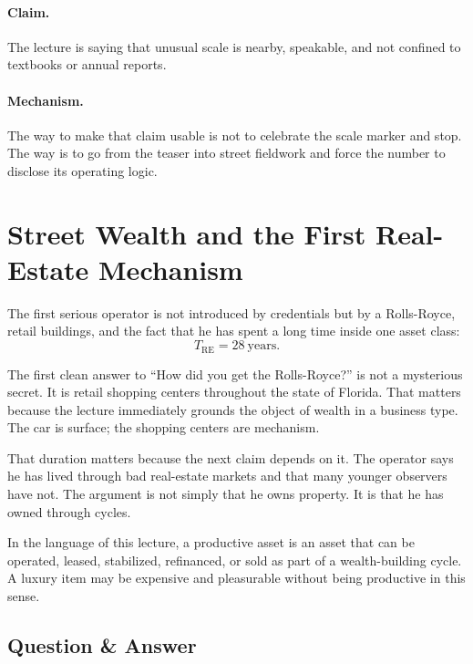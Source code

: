 \paragraph{Claim.}
The lecture is saying that unusual scale is nearby, speakable, and not confined to textbooks or annual reports.

\paragraph{Mechanism.}
The way to make that claim usable is not to celebrate the scale marker and stop. The way is to go from the teaser into street fieldwork and force the number to disclose its operating logic.

\section{Street Wealth and the First Real-Estate Mechanism}

The first serious operator is not introduced by credentials but by a Rolls-Royce, retail buildings, and the fact that he has spent a long time inside one asset class:
\begin{equation}
T_{\mathrm{RE}} = 28\ \text{years}.
\end{equation}

The first clean answer to ``How did you get the Rolls-Royce?'' is not a mysterious secret. It is retail shopping centers throughout the state of Florida. That matters because the lecture immediately grounds the object of wealth in a business type. The car is surface; the shopping centers are mechanism.

That duration matters because the next claim depends on it. The operator says he has lived through bad real-estate markets and that many younger observers have not. The argument is not simply that he owns property. It is that he has owned through cycles.

\begin{definition}
In the language of this lecture, a productive asset is an asset that can be operated, leased, stabilized, refinanced, or sold as part of a wealth-building cycle. A luxury item may be expensive and pleasurable without being productive in this sense.
\end{definition}

\subsection{Question \& Answer}

